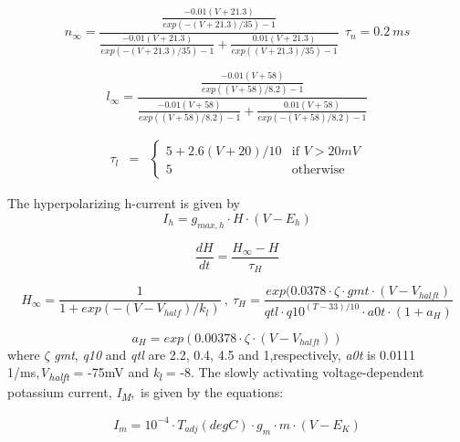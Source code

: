 \documentclass[12pt]{article}
\begin{document}
\begin{equation}
n_{\infty} = \frac{\frac{-0.01(V+21.3)}{exp(-(V+21.3)/35)-1}}{\frac{-0.01(V+21.3)}{exp(-(V+21.3)/35)-1} + \frac{0.01(V+21.3)}{exp( (V+21.3)/35)-1} } \ \ \tau_n=0.2 \ ms
\end{equation}

\begin{equation}
l_{\infty} = \frac{\frac{-0.01(V+58)}{exp( (V+58)/8.2)-1}}{\frac{-0.01(V+58)}{exp( (V+58)/8.2)-1} + \frac{0.01(V+58)}{exp(-(V+58)/8.2)-1}}
\end{equation}

\begin{equation}
\begin{matrix}
\tau_l & =
& \left\{
\begin{matrix}
5+2.6(V+20)/10 & \mbox{if } V > 20 mV \\
5 & \mbox{otherwise }
\end{matrix} \right.
\end{matrix}
\end{equation}


The hyperpolarizing h-current is given by
\begin{equation}
I_h=g_{max, h} \cdot H \cdot (V-E_h)
\end{equation}

\begin{equation}
\frac{dH}{dt}=\frac{H_{\infty}-H}{\tau_{H}}
\end{equation}

\begin{equation}
H_{\infty }=\frac {1}{1+exp(-(V-V_{half})/k_l)} \ , \ 
\tau_{H}=\frac{exp( 0.0378\cdot \zeta \cdot gmt\cdot
	(V-V_{halft})}{qtl \cdot q10^{(T-33)/10}\cdot a0t \cdot
	(1+a_{H})}
\end{equation}

\begin{equation}
a_{H}=exp( 0.00378\cdot \zeta\cdot (V-V_{halft}))
\end{equation}
where $\zeta$ {\textit{gmt}}{, }{\textit{q10}}{ and }{\textit{qtl}}{ are 2.2, 0.4, 4.5 and 1,respectively, }{\textit{a0t}}{ is 0.0111 1/ms,}{\textit{V}}{\textit{\textsubscript{halft}}}{ = -75mV and }{\textit{k}}{\textit{\textsubscript{l}}}{ = -8.}
The slowly activating voltage‑dependent potassium current, \textit{I}\textit{\textsubscript{M}},~is given by the
equations:


\begin{equation}
I_m=10^{-4}\cdot T_{adj}(degC)\cdot g_m\cdot m\cdot
(V-E_K)
\end{equation}
\end{document}
